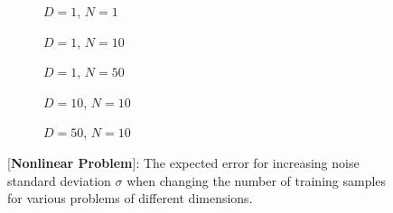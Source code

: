 \begin{figure}[!h]
  \centering
    \begin{subfigure}{0.3\textwidth}
      \centering
      \caption{$D=1$, $N=1$}
      \label{fig:nonlinear-std_y-N-1-D-1}
    \end{subfigure}
    \begin{subfigure}{0.3\textwidth}
      \centering
      \caption{$D=1$, $N=10$}
      \label{fig:nonlinear-std_y-N-10-D-1}
    \end{subfigure}
    \begin{subfigure}{0.3\textwidth}
      \centering
      \caption{$D=1$, $N=50$}
      \label{fig:nonlinear-std_y-N-50-D-1}
    \end{subfigure}

    \begin{subfigure}{0.3\textwidth}
      \centering
      \caption{$D=10$, $N=10$}
      \label{fig:nonlinear-std_y-N-10-D-10}
    \end{subfigure}
    \begin{subfigure}{0.3\textwidth}
      \centering
      \caption{$D=50$, $N=10$}
      \label{fig:nonlinear-std_y-N-10-D-50}
    \end{subfigure}  

  \caption{[\textbf{Nonlinear Problem}]: The expected error for increasing noise standard deviation $\sigma$  when changing the number of training samples for various problems of different dimensions.}
  \label{fig:nonlinear-std_y}
\end{figure}

